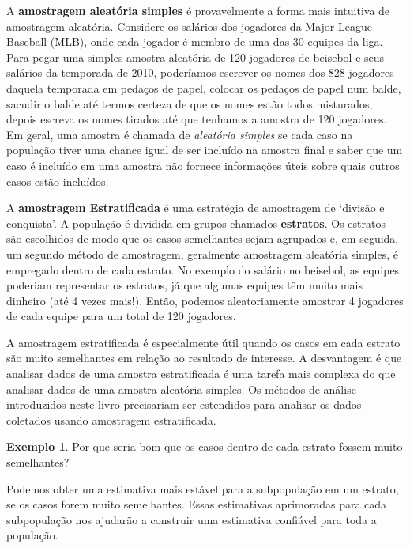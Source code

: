 \documentclass[
]{book}
\theoremstyle{definition}
\theoremstyle{definition}
\newtheorem{example}{Exemplo}[chapter]
\theoremstyle{definition}
\theoremstyle{definition}
\theoremstyle{remark}
\begin{document}
A \textbf{amostragem aleatória simples} é provavelmente a forma mais intuitiva de amostragem aleatória. Considere os salários dos jogadores da Major League Baseball (MLB), onde cada jogador é membro de uma das 30 equipes da liga. Para pegar uma simples amostra aleatória de 120 jogadores de beisebol e seus salários da temporada de 2010, poderíamos escrever os nomes dos 828 jogadores daquela temporada em pedaços de papel, colocar os pedaços de papel num balde, sacudir o balde até termos certeza de que os nomes estão todos misturados, depois escreva os nomes tirados até que tenhamos a amostra de 120 jogadores. Em geral, uma amostra é chamada de \emph{aleatória simples} se cada caso na população tiver uma chance igual de ser incluído na amostra final e saber que um caso é incluído em uma amostra não fornece informações úteis sobre quais outros casos estão incluídos.

A \textbf{amostragem Estratificada} é uma estratégia de amostragem de `divisão e conquista'. A população é dividida em grupos chamados \textbf{estratos}. Os estratos são escolhidos de modo que os casos semelhantes sejam agrupados e, em seguida, um segundo método de amostragem, geralmente amostragem aleatória simples, é empregado dentro de cada estrato. No exemplo do salário no beisebol, as equipes poderiam representar os estratos, já que algumas equipes têm muito mais dinheiro (até 4 vezes mais!). Então, podemos aleatoriamente amostrar 4 jogadores de cada equipe para um total de 120 jogadores.

A amostragem estratificada é especialmente útil quando os casos em cada estrato são muito semelhantes em relação ao resultado de interesse. A desvantagem é que analisar dados de uma amostra estratificada é uma tarefa mais complexa do que analisar dados de uma amostra aleatória simples. Os métodos de análise introduzidos neste livro precisariam ser estendidos para analisar os dados coletados usando amostragem estratificada.

\begin{example}
\protect\hypertarget{exm:unnamed-chunk-12}{}{\label{exm:unnamed-chunk-12} }Por que seria bom que os casos dentro de cada estrato fossem muito semelhantes?
\end{example}

Podemos obter uma estimativa mais estável para a subpopulação em um estrato, se os casos forem muito semelhantes. Essas estimativas aprimoradas para cada subpopulação nos ajudarão a construir uma estimativa confiável para toda a população.
\end{document}
